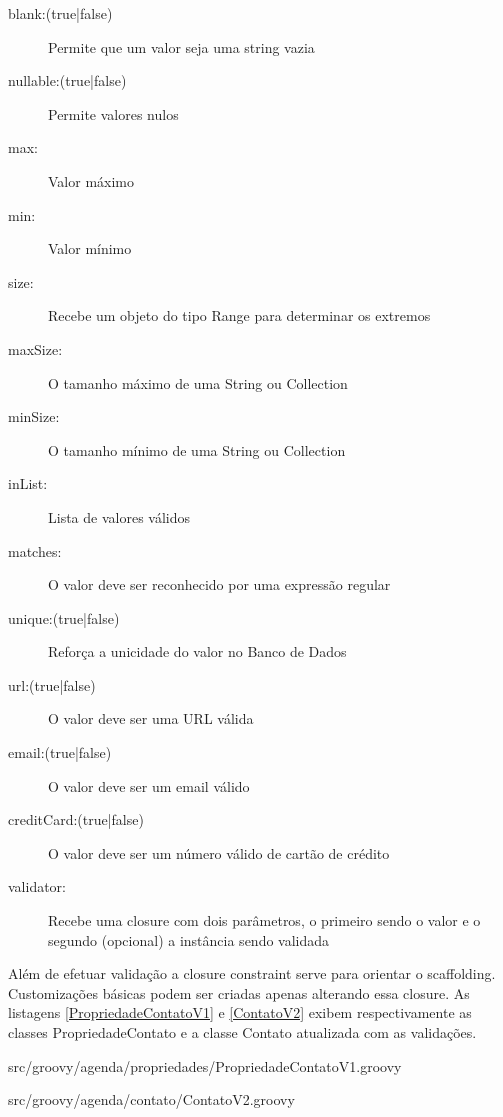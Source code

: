 \documentclass[12pt]{article}
\begin{document}
  \begin{description}
      \item[blank:(true|false)] Permite que um valor seja uma string vazia
      \item[nullable:(true|false)] Permite valores nulos
      \item[max:] Valor máximo
      \item[min:] Valor mínimo
      \item[size:] Recebe um objeto do tipo Range para determinar os extremos
      \item[maxSize:] O tamanho máximo de uma String ou Collection
      \item[minSize:] O tamanho mínimo de uma String ou Collection
      \item[inList:] Lista de valores válidos
      \item[matches:] O valor deve ser reconhecido por uma expressão regular
      \item[unique:(true|false)] Reforça a unicidade do valor no Banco de Dados
      \item[url:(true|false)] O valor deve ser uma URL válida
      \item[email:(true|false)] O valor deve ser um email válido
      \item[creditCard:(true|false)] O valor deve ser um número válido de cartão
                                     de crédito
      \item[validator:] Recebe uma closure com dois parâmetros, o primeiro sendo 
                        o valor e o segundo (opcional) a instância sendo validada
  \end{description}
  
  Além de efetuar validação a closure constraint serve para orientar o scaffolding.
  Customizações básicas podem ser criadas apenas alterando essa closure. As listagens
  \ref{PropriedadeContatoV1} e \ref{ContatoV2} exibem respectivamente as classes
  PropriedadeContato e a classe Contato atualizada com as validações.
  
  
                    {src/groovy/agenda/propriedades/PropriedadeContatoV1.groovy}
                    
  
                  {src/groovy/agenda/contato/ContatoV2.groovy}
    
\end{document}
